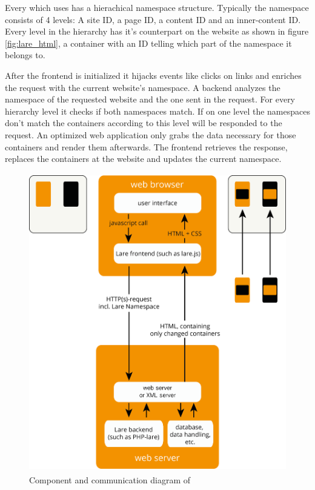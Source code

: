 Every \singlePageApplication{} which uses \lare{} has a hierachical namespace structure.
Typically the namespace consists of 4 levels: A site ID, a page ID, a content ID and an inner-content ID.
Every level in the hierarchy has it's counterpart on the website as shown in figure \ref{fig:lare_html}, a container with an ID telling which part of the namespace it belongs to.

After the \lare{} frontend is initialized it hijacks events like clicks on links and enriches the request with the current website's namespace.
A \lare{} backend analyzes the namespace of the requested website and the one sent in the request.
For every hierarchy level it checks if both namespaces match.
If on one level the namespaces don't match the containers according to this level will be responded to the request.
An optimized web application only grabs the data necessary for those containers and render them afterwards.
The \lare{} frontend retrieves the response, replaces the containers at the website and updates the current namespace.

\begin{figure}[H]
\centering
\includegraphics[height=13cm]{images/lare.png}
\caption[lare_components]{Component and communication diagram of \lare{}}
\label{fig:lare_components}
\end{figure}


